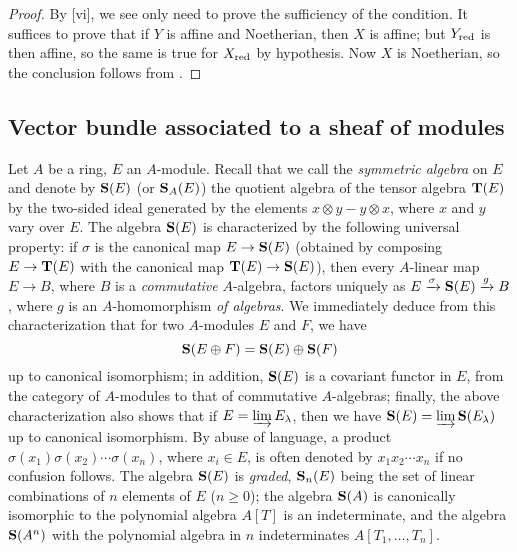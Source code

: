 \begin{proof}
By [vi], we see only need to prove the sufficiency of the condition.
It suffices to prove that if $Y$ is affine and Noetherian, then $X$ is affine; but $Y_{\mathrm{red}}$ is then affine, so the same is true for $X_{\mathrm{red}}$ by hypothesis.
Now $X$ is Noetherian, so the conclusion follows from .
\end{proof}

\subsection{Vector bundle associated to a sheaf of modules}
\label{subsection:II.1.7}

\begin{env}[1.7.1]
\label{II.1.7.1}
Let $A$ be a ring, $E$ an $A$-module.
Recall that we call the \emph{symmetric algebra} on $E$ and denote by $\mathbf{S}(E)$ (or $\mathbf{S}_A(E)$) the quotient algebra of the tensor algebra $\mathbf{T}(E)$ by the two-sided ideal generated by the elements $x\otimes y-y\otimes x$, where $x$ and $y$ vary over $E$.
The algebra $\mathbf{S}(E)$ is characterized by the following universal property: if $\sigma$ is the canonical map $E\to\bb{S}(E)$ (obtained by composing $E\to\bb{T}(E)$ with the canonical map $\bb{T}(E)\to\bb{S}(E)$), then every $A$-linear map $E\to B$, where $B$ is a \emph{commutative} $A$-algebra, factors uniquely as $E\xrightarrow{\sigma}\mathbf{S}(E)\xrightarrow{g}B$, where $g$ is an $A$-homomorphism \emph{of algebras}.
We immediately deduce from this characterization that for two $A$-modules $E$ and $F$, we have
\[
  \mathbf{S}(E\oplus F)=\mathbf{S}(E)\oplus\mathbf{S}(F)
\]
up to canonical isomorphism; in addition, $\mathbf{S}(E)$ is a covariant functor in $E$, from the category of $A$-modules to that of commutative $A$-algebras; finally, the above characterization also shows that if $E=\varinjlim E_\lambda$, then we have $\mathbf{S}(E)=\varinjlim\mathbf{S}(E_\lambda)$ up to canonical isomorphism.
By abuse of language, a product $\sigma(x_1)\sigma(x_2)\cdots\sigma(x_n)$, where $x_i\in E$, is often denoted by $x_1 x_2\cdots x_n$ if no confusion follows.
The algebra $\mathbf{S}(E)$ is \emph{graded}, $\mathbf{S}_n(E)$ being the set of linear combinations of $n$ elements of $E$ ($n\geq 0$); the algebra $\mathbf{S}(A)$ is canonically isomorphic to the polynomial algebra $A[T]$ is an indeterminate, and the algebra $\mathbf{S}(A^n)$ with the polynomial algebra in $n$ indeterminates $A[T_1,\dots,T_n]$.
\end{env}

